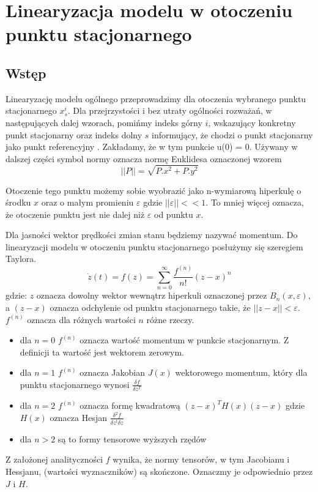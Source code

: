 \documentclass{article}
\begin{document}
	\maketitle
	\section{Linearyzacja modelu w otoczeniu punktu stacjonarnego}
	\subsection{Wstęp}
	Linearyzację modelu ogólnego przeprowadzimy dla otoczenia wybranego punktu
	stacjonarnego $x_s^i$. Dla przejrzystości i bez utraty ogólności rozważań, w następujących
	dalej wzorach, pomińmy indeks górny $i$, wskazujący konkretny punkt stacjonarny oraz
	indeks dolny $s$ informujący, że chodzi o punkt stacjonarny jako punkt referencyjny .
	Zakładamy, że w tym punkcie u(0) = 0. Używany w dalszej części symbol normy oznacza
	normę Euklidesa oznaczonej wzorem
	\begin{equation}
		||P|| = \sqrt{P.x^2 + P.y^2}
	\end{equation}

	Otoczenie tego punktu możemy sobie wyobrazić jako n-wymiarową hiperkulę o środku $x$
	oraz o małym promieniu $\varepsilon$ gdzie $||\varepsilon|| << 1$.
	To mniej więcej oznacza, że otoczenie punktu jest nie dalej niż $\varepsilon$ od punktu $x$.
	
	Dla jasności wektor prędkości zmian stanu będziemy nazywać momentum.
	Do linearyzacji modelu w otoczeniu punktu stacjonarnego posłużymy się szeregiem Taylora.
	\begin{equation}
		\dot{z}(t) = f(z) = \sum_{n=0}^{\infty}\frac{f^{(n)}}{n!}(z-x)^n
	\end{equation}
	gdzie: $z$ oznacza dowolny wektor wewnątrz hiperkuli oznaczonej przez $B_n(x, \varepsilon)$, a 
	$(z-x)$ oznacza odchylenie od punktu stacjonarnego takie, że $||z-x||<\varepsilon$.
	$f^{(n)}$ oznacza dla różnych wartości $n$ różne rzeczy.
	\begin{itemize}
		\item dla $n=0$ $f^{(n)}$ oznacza wartość momentum w punkcie stacjonarnym.
			Z definicji ta wartość jest wektorem zerowym.
		\item dla $n=1$ $f^{(n)}$ oznacza Jakobian $J(x)$ wektorowego momentum, który dla 
			punktu stacjonarnego wynosi $\frac{\delta f}{\delta z^T}$
		\item dla $n=2$ $f^{(n)}$ oznacza formę kwadratową $(z-x)^TH(x)(z-x)$
			gdzie $H(x)$ oznacza Hesjan $\frac{\delta^2f}{\delta z^t \delta z}$
		\item dla $n>2$ są to formy tensorowe wyższych rzędów
	\end{itemize}
	Z założonej analityczności
	$f$ wynika, że normy tensorów, w tym Jacobianu i Hessjanu, 
	(wartości wyznaczników) są skończone. Oznaczmy je odpowiednio przez $J$ i $H$.
\end{document}
